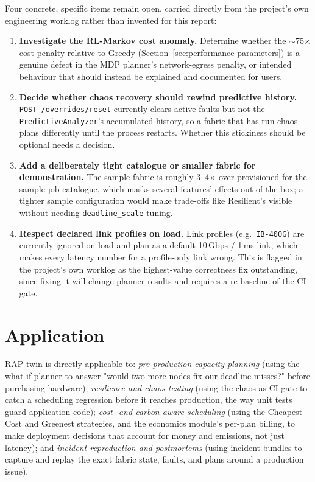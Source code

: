 \documentclass[12pt,a4]{report}
\begin{document}
Four concrete, specific items remain open, carried directly from the project's own engineering worklog rather than invented for this report:

\begin{enumerate}
    \item \textbf{Investigate the RL-Markov cost anomaly.} Determine whether the $\sim$75$\times$ cost penalty relative to Greedy (Section~\ref{sec:performance-parameters}) is a genuine defect in the MDP planner's network-egress penalty, or intended behaviour that should instead be explained and documented for users.
    \item \textbf{Decide whether chaos recovery should rewind predictive history.} \texttt{POST /overrides/reset} currently clears active faults but not the \texttt{PredictiveAnalyzer}'s accumulated history, so a fabric that has run chaos plans differently until the process restarts. Whether this stickiness should be optional needs a decision.
    \item \textbf{Add a deliberately tight catalogue or smaller fabric for demonstration.} The sample fabric is roughly 3--4$\times$ over-provisioned for the sample job catalogue, which masks several features' effects out of the box; a tighter sample configuration would make trade-offs like Resilient's visible without needing \texttt{deadline\_scale} tuning.
    \item \textbf{Respect declared link profiles on load.} Link profiles (e.g.\ \texttt{IB-400G}) are currently ignored on load and plan as a default 10\,Gbps / 1\,ms link, which makes every latency number for a profile-only link wrong. This is flagged in the project's own worklog as the highest-value correctness fix outstanding, since fixing it will change planner results and requires a re-baseline of the CI gate.
\end{enumerate}

 \section{Application}

RAP twin is directly applicable to: \textit{pre-production capacity planning} (using the what-if planner to answer "would two more nodes fix our deadline misses?" before purchasing hardware); \textit{resilience and chaos testing} (using the chaos-as-CI gate to catch a scheduling regression before it reaches production, the way unit tests guard application code); \textit{cost- and carbon-aware scheduling} (using the Cheapest-Cost and Greenest strategies, and the economics module's per-plan billing, to make deployment decisions that account for money and emissions, not just latency); and \textit{incident reproduction and postmortems} (using incident bundles to capture and replay the exact fabric state, faults, and plans around a production issue).
 
\end{document}
